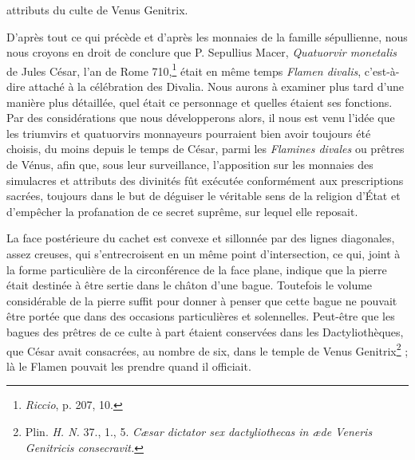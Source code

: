 \documentclass[a4paper, 11pt, oneside, polutonikogreek, french]{article}
\begin{document}
attributs du culte de Venus Genitrix.

D'après tout ce qui précède et d'après les monnaies de la famille sépullienne, nous nous croyons en droit de conclure que P. Sepullius Macer, \emph{Quatuorvir monetalis} de Jules César, l'an de Rome 710,\footnote{\emph{Riccio}, p. 207, 10.} était en même temps \emph{Flamen divalis}, c'est-à-dire attaché à la célébration des Divalia. Nous aurons à examiner plus tard d'une manière plus détaillée, quel était ce personnage et quelles étaient ses fonctions. Par des considérations que nous développerons alors, il nous est venu l'idée que les triumvirs et quatuorvirs monnayeurs pourraient bien avoir toujours été choisis, du moins depuis le temps de César, parmi les \emph{Flamines divales} ou prêtres de Vénus, afin que, sous leur surveillance, l'apposition sur les monnaies des simulacres et attributs des divinités fût exécutée conformément aux prescriptions sacrées, toujours dans le but de déguiser le véritable sens de la religion d'État et d'empêcher la profanation de ce secret suprême, sur lequel elle reposait.

La face postérieure du cachet est convexe et sillonnée par des lignes diagonales, assez creuses, qui s'entrecroisent en un même point d'intersection, ce qui, joint à la forme particulière de la circonférence de la face plane, indique que la pierre était destinée à être sertie dans le châton d'une bague. Toutefois le volume considérable de la pierre suffit pour donner à penser que cette bague ne pouvait être portée que dans des occasions particulières et solennelles. Peut-être que les bagues des prêtres de ce culte à part étaient conservées dans les Dactyliothèques, que César avait consacrées, au nombre de six, dans le temple de Venus Genitrix\footnote{Plin. \emph{H. N.} 37., 1., 5. \emph{Cæsar dictator sex dactyliothecas in æde Veneris Genitricis consecravit.}} ; là le Flamen pouvait les prendre quand il officiait.
\end{document}
